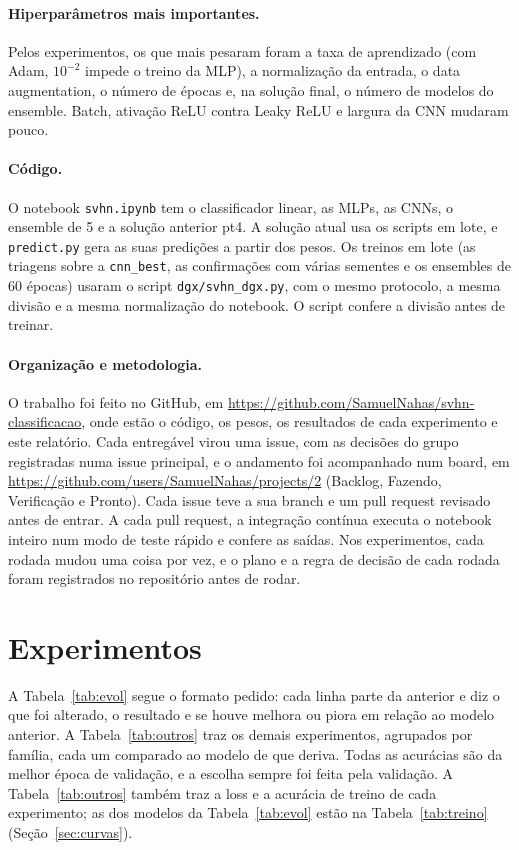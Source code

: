 \documentclass[11pt,a4paper]{article}
\begin{document}
\paragraph{Hiperparâmetros mais importantes.} Pelos experimentos, os que mais pesaram foram a taxa de
aprendizado (com Adam, $10^{-2}$ impede o treino da MLP), a normalização da entrada, o data augmentation, o
número de épocas e, na solução final, o número de modelos do ensemble. Batch, ativação ReLU contra Leaky ReLU e
largura da CNN mudaram pouco.

\paragraph{Código.} O notebook \texttt{svhn.ipynb} tem o classificador linear, as MLPs, as CNNs, o ensemble de
5 e a solução anterior pt4. A solução atual usa os scripts em lote, e \texttt{predict.py} gera as suas predições a partir dos pesos. Os treinos em lote (as triagens sobre a \texttt{cnn\_best}, as confirmações com
várias sementes e os ensembles de 60 épocas) usaram o script \texttt{dgx/svhn\_dgx.py}, com o mesmo protocolo, a
mesma divisão e a mesma normalização do notebook. O script confere a divisão antes de treinar.

\paragraph{Organização e metodologia.} O trabalho foi feito no GitHub, em
\url{https://github.com/SamuelNahas/svhn-classificacao}, onde estão o código, os pesos, os resultados de cada
experimento e este relatório. Cada entregável virou uma issue, com as decisões do grupo registradas numa issue
principal, e o andamento foi acompanhado num board, em
\url{https://github.com/users/SamuelNahas/projects/2} (Backlog, Fazendo, Verificação e Pronto). Cada issue teve a
sua branch e um pull request revisado antes de entrar. A cada pull request, a integração contínua executa o
notebook inteiro num modo de teste rápido e confere as saídas. Nos experimentos, cada rodada mudou uma coisa
por vez, e o plano e a regra de decisão de cada rodada foram registrados no repositório antes de rodar.

\section{Experimentos}

A Tabela~\ref{tab:evol} segue o formato pedido: cada linha parte da anterior e diz o que foi alterado, o
resultado e se houve melhora ou piora em relação ao modelo anterior. A Tabela~\ref{tab:outros} traz os demais
experimentos, agrupados por família, cada um comparado ao modelo de que deriva. Todas as acurácias são da melhor
época de validação, e a escolha sempre foi feita pela validação. A Tabela~\ref{tab:outros} também traz a loss e a acurácia de treino de cada
experimento; as dos modelos da Tabela~\ref{tab:evol} estão na Tabela~\ref{tab:treino} (Seção~\ref{sec:curvas}).
\end{document}
